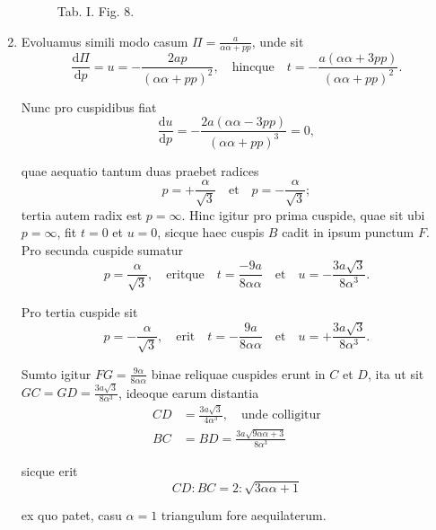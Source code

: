 \documentclass[10pt,a4paper]{article}
\def\D{\mathrm{d}}
\begin{document}
\begin{paracol}{2}
\begin{enumerate}[topsep=1px]
\begin{figure}[h]
{\begin{tikzpicture}[rotate=180, scale=1]
				\end{tikzpicture}}
			\selectfont
			\caption{Tab. I. Fig. 8.}
		\end{figure}
	
		\switchcolumn*
		
		\item Evoluamus simili modo casum $\Pi = \frac{a}{\alpha\alpha + pp}$, unde sit
		\[
			\frac{\D \Pi}{\D p} = u = -\frac{2a p}{(\alpha \alpha + pp)^2}, \quad \text{hincque}\quad t = -\frac{a(\alpha \alpha+ 3pp)}{(\alpha \alpha +pp)^2}.
		\]
		\par Nunc pro cuspidibus fiat
		\[
			\frac{\D u}{ \D p} = -\frac{2a(\alpha\alpha- 3pp)}{(\alpha\alpha+ pp)^3} = 0,
		\]
		\par quae aequatio tantum duas praebet radices
		\[
			p = +\frac{\alpha}{\sqrt{3}} \quad \text{et} \quad p = -\frac{\alpha}{\sqrt{3}};
		\]
		tertia autem radix est $p=\infty$. Hinc igitur pro prima cuspide, quae sit ubi $p=\infty$, fit $t=0$ et $u=0$, sicque haec cuspis $B$ cadit in ipsum punctum $F$. Pro secunda cuspide sumatur
		\[
			p = \frac{\alpha}{\sqrt{3}}, \quad \text{eritque}\quad t = \frac{-9a}{8\alpha \alpha} \quad \text{et} \quad u=-\frac{3a \sqrt{3}}{8\alpha^3}.
		\]
		\par Pro tertia cuspide sit
		\[
			p = -\frac{\alpha}{\sqrt{3}}, \quad \text{erit} \quad t = -\frac{9a}{8\alpha \alpha} \quad \text{et} \quad u=+\frac{3a \sqrt{3}}{8\alpha^3}.
		\]
		\par Sumto igitur $FG = \frac{9\alpha}{8\alpha \alpha}$ binae reliquae cuspides erunt in $C$ et $D$, ita ut sit $GC = GD = \frac{3a \sqrt{3}}{8\alpha^3}$, ideoque earum distantia
		\begin{align*}
			CD& = \frac{3a \sqrt{3}}{4\alpha^3}, \quad \text{unde colligitur}\\
			BC &= BD = \frac{3a \sqrt{9\alpha \alpha+3}}{8\alpha^3}
		\end{align*}
		\par sicque erit
		\[
			CD : BC = 2:\sqrt{3\alpha\alpha + 1}
		\]
		\par ex quo patet, casu $\alpha = 1$ triangulum fore aequilaterum.
		

\end{enumerate}
\end{paracol}
\end{document}

